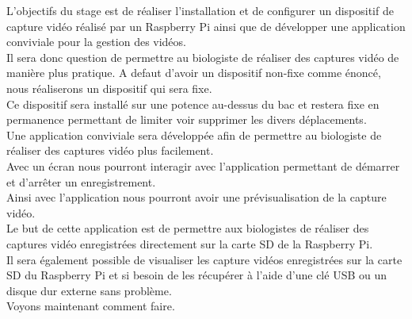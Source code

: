     \begin{flushleft}
        L’objectifs du stage est de réaliser l’installation et de configurer un dispositif de capture vidéo réalisé par un Raspberry Pi ainsi que de développer une application conviviale pour la gestion des vidéos.
        \\[0.2cm]

        Il sera donc question de permettre au biologiste de réaliser des captures vidéo de manière plus pratique.
        A defaut d'avoir un dispositif non-fixe comme énoncé, nous réaliserons un dispositif qui sera fixe.\\[0.2cm]

        Ce dispositif sera installé sur une potence au-dessus du bac et restera fixe en permanence permettant de limiter voir supprimer les divers déplacements.\\[0.2cm]                
        
        Une application conviviale sera développée afin de permettre au biologiste de réaliser des captures vidéo plus facilement.\\[0.2cm]

        Avec un écran nous pourront interagir avec l'application permettant de démarrer et d'arrêter un enregistrement.\\[0.2cm]

        Ainsi avec l'application nous pourront avoir une prévisualisation de la capture vidéo.\\[0.2cm]
    
        Le but de cette application est de permettre aux biologistes de réaliser des captures vidéo enregistrées directement sur la carte SD de la Raspberry Pi.\\[0.2cm]

        Il sera également possible de visualiser les capture vidéos enregistrées sur la carte SD du Raspberry Pi et si besoin de les récupérer à l'aide d'une clé USB ou un disque dur externe sans problème.\\[0.2cm]

        Voyons maintenant comment faire.
    \end{flushleft}
